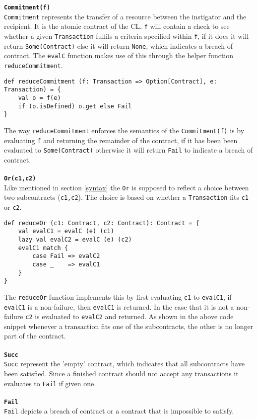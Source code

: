 \documentclass{ituthesis}
\begin{document}
\textbf{\texttt{Commitment(f)}} \\
\texttt{Commitment} represents the transfer of a resource between the instigator and the recipient. It is the atomic contract of the CL. \texttt{f} will contain a check to see whether a given \texttt{Transaction} fulfils a criteria specified within \texttt{f}, if it does it will return \texttt{Some(Contract)} else it will return \texttt{None}, which indicates a breach of contract. The \texttt{evalC} function makes use of this through the helper function \texttt{reduceCommitment}.
\begin{lstlisting}
def reduceCommitment (f: Transaction => Option[Contract], e: Transaction) = {
    val o = f(e)
    if (o.isDefined) o.get else Fail
}
\end{lstlisting}
The way \texttt{reduceCommitment} enforces the semantics of the \texttt{Commitment(f)} is by evaluating \texttt{f} and returning the remainder of the contract, if it has been been evaluated to \texttt{Some(Contract)} otherwise it will return \texttt{Fail} to indicate a breach of contract. \\\\
%
\textbf{\texttt{Or(c1,c2)}} \\
Like mentioned in section \ref{syntax} the \texttt{Or} is supposed to reflect a choice between two subcontracts (\texttt{c1,c2}). The choice is based on whether a \texttt{Transaction} fits \texttt{c1} or \texttt{c2}.
\begin{lstlisting}
def reduceOr (c1: Contract, c2: Contract): Contract = {
    val evalC1 = evalC (e) (c1)
    lazy val evalC2 = evalC (e) (c2)
    evalC1 match {
        case Fail => evalC2
        case _    => evalC1
    }
}
\end{lstlisting}
The \texttt{reduceOr} function implements this by first evaluating \texttt{c1} to \texttt{evalC1}, if \texttt{evalC1} is a non-failure, then \texttt{evalC1} is returned. In the case that it is not a non-failure \texttt{c2} is evaluated to \texttt{evalC2} and returned. As shown in the above code snippet whenever a transaction fits one of the subcontracts, the other is no longer part of the contract. \\\\
\textbf{\texttt{Succ}} \\
\texttt{Succ} represent the 'empty' contract, which indicates that all subcontracts have been satisfied. Since a finished contract should not accept any transactions it evaluates to \texttt{Fail} if given one. \\\\
\textbf{\texttt{Fail}} \\
\texttt{Fail} depicts a breach of contract or a contract that is impossible to satisfy.
\end{document}
